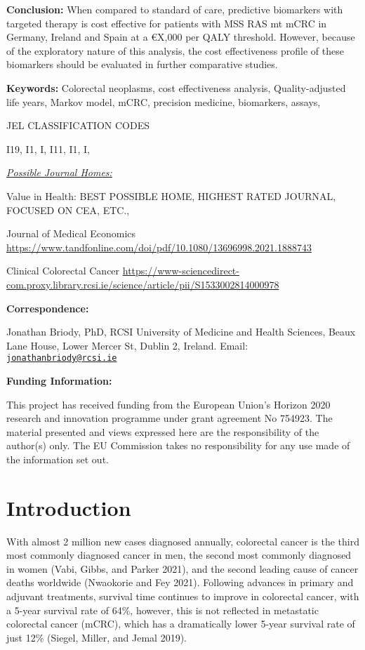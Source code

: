\documentclass[
]{article}
\begin{document}
\textbf{Conclusion:} When compared to standard of care, predictive
biomarkers with targeted therapy is cost effective for patients with MSS
RAS mt mCRC in Germany, Ireland and Spain at a €X,000 per QALY
threshold. However, because of the exploratory nature of this analysis,
the cost effectiveness profile of these biomarkers should be evaluated
in further comparative studies.

\textbf{Keywords:} Colorectal neoplasms, cost effectiveness analysis,
Quality-adjusted life years, Markov model, mCRC, precision medicine,
biomarkers, assays,

JEL CLASSIFICATION CODES

I19, I1, I, I11, I1, I,

\underline{\emph{Possible Journal Homes:}}

Value in Health: BEST POSSIBLE HOME, HIGHEST RATED JOURNAL, FOCUSED ON
CEA, ETC.,

Journal of Medical Economics
\url{https://www.tandfonline.com/doi/pdf/10.1080/13696998.2021.1888743}

Clinical Colorectal Cancer
\url{https://www-sciencedirect-com.proxy.library.rcsi.ie/science/article/pii/S1533002814000978}

\textbf{Correspondence:}

Jonathan Briody, PhD, RCSI University of Medicine and Health Sciences,
Beaux Lane House, Lower Mercer St, Dublin 2, Ireland. Email:
\href{mailto:jonathanbriody@rcsi.ie}{\nolinkurl{jonathanbriody@rcsi.ie}}

\textbf{Funding Information:}

This project has received funding from the European Union's Horizon 2020
research and innovation programme under grant agreement No 754923. The
material presented and views expressed here are the responsibility of
the author(s) only. The EU Commission takes no responsibility for any
use made of the information set out.

\newpage

\hypertarget{introduction}{%
\section{Introduction}\label{introduction}}

With almost 2 million new cases diagnosed annually, colorectal cancer is
the third most commonly diagnosed cancer in men, the second most
commonly diagnosed in women (Vabi, Gibbs, and Parker 2021), and the
second leading cause of cancer deaths worldwide (Nwaokorie and Fey
2021). Following advances in primary and adjuvant treatments, survival
time continues to improve in colorectal cancer, with a 5-year survival
rate of 64\%, however, this is not reflected in metastatic colorectal
cancer (mCRC), which has a dramatically lower 5-year survival rate of
just 12\% (Siegel, Miller, and Jemal 2019).
\end{document}
